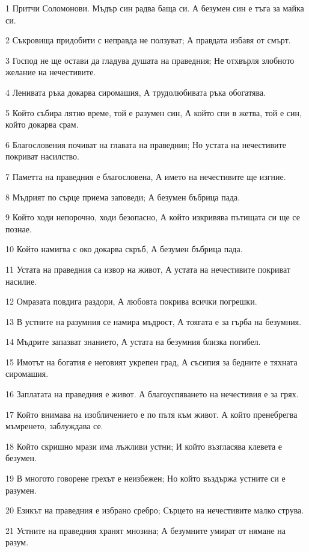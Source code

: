 \par 1 Притчи Соломонови. Мъдър син радва баща си. А безумен син е тъга за майка си.
\par 2 Съкровища придобити с неправда не ползуват; А правдата избавя от смърт.
\par 3 Господ не ще остави да гладува душата на праведния; Не отхвърля злобното желание на нечестивите.
\par 4 Ленивата ръка докарва сиромашия, А трудолюбивата ръка обогатява.
\par 5 Който събира лятно време, той е разумен син, А който спи в жетва, той е син, който докарва срам.
\par 6 Благословения почиват на главата на праведния; Но устата на нечестивите покриват насилство.
\par 7 Паметта на праведния е благословена, А името на нечестивите ще изгние.
\par 8 Мъдрият по сърце приема заповеди; А безумен бъбрица пада.
\par 9 Който ходи непорочно, ходи безопасно, А който изкривява пътищата си ще се познае.
\par 10 Който намигва с око докарва скръб, А безумен бъбрица пада.
\par 11 Устата на праведния са извор на живот, А устата на нечестивите покриват насилие.
\par 12 Омразата повдига раздори, А любовта покрива всички погрешки.
\par 13 В устните на разумния се намира мъдрост, А тоягата е за гърба на безумния.
\par 14 Мъдрите запазват знанието, А устата на безумния близка погибел.
\par 15 Имотът на богатия е неговият укрепен град, А съсипия за бедните е тяхната сиромашия.
\par 16 Заплатата на праведния е живот. А благоуспяването на нечестивия е за грях.
\par 17 Който внимава на изобличението е по пътя към живот. А който пренебрегва мъмренето, заблуждава се.
\par 18 Който скришно мрази има лъжливи устни; И който възгласява клевета е безумен.
\par 19 В многото говорене грехът е неизбежен; Но който въздържа устните си е разумен.
\par 20 Езикът на праведния е избрано сребро; Сърцето на нечестивите малко струва.
\par 21 Устните на праведния хранят мнозина; А безумните умират от нямане на разум.
